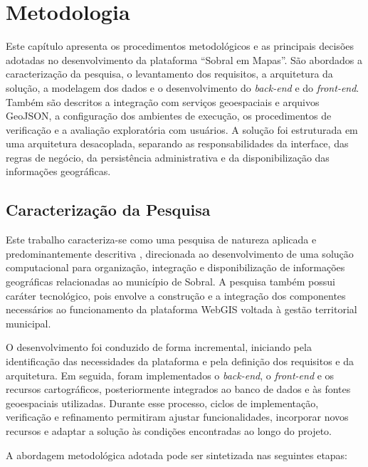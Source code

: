 \chapter{Metodologia}
\label{cap:metodologia}

Este capítulo apresenta os procedimentos metodológicos e as principais decisões adotadas no desenvolvimento da plataforma ``Sobral em Mapas''. São abordados a caracterização da pesquisa, o levantamento dos requisitos, a arquitetura da solução, a modelagem dos dados e o desenvolvimento do \textit{back-end} e do \textit{front-end}. Também são descritos a integração com serviços geoespaciais e arquivos GeoJSON, a configuração dos ambientes de execução, os procedimentos de verificação e a avaliação exploratória com usuários. A solução foi estruturada em uma arquitetura desacoplada, separando as responsabilidades da interface, das regras de negócio, da persistência administrativa e da disponibilização das informações geográficas.

\section{Caracterização da Pesquisa}
\label{sec:caracterizacao-pesquisa}

Este trabalho caracteriza-se como uma pesquisa de natureza aplicada e predominantemente descritiva \cite{ProdanovFreitas2013}, direcionada ao desenvolvimento de uma solução computacional para organização, integração e disponibilização de informações geográficas relacionadas ao município de Sobral. A pesquisa também possui caráter tecnológico, pois envolve a construção e a integração dos componentes necessários ao funcionamento da plataforma WebGIS voltada à gestão territorial municipal.

O desenvolvimento foi conduzido de forma incremental, iniciando pela identificação das necessidades da plataforma e pela definição dos requisitos e da arquitetura. Em seguida, foram implementados o \textit{back-end}, o \textit{front-end} e os recursos cartográficos, posteriormente integrados ao banco de dados e às fontes geoespaciais utilizadas. Durante esse processo, ciclos de implementação, verificação e refinamento permitiram ajustar funcionalidades, incorporar novos recursos e adaptar a solução às condições encontradas ao longo do projeto.

A abordagem metodológica adotada pode ser sintetizada nas seguintes etapas:

